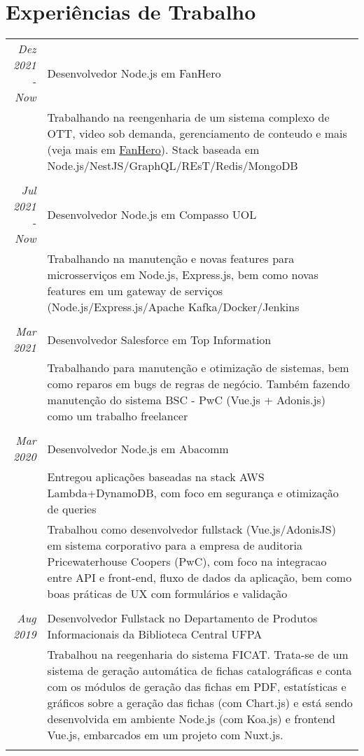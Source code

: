 \documentclass[a4paper,10pt]{article}
\begin{document}
\section{Experiências de Trabalho}
\begin{tabular}{r|p{11cm}}
\emph{Dez 2021 - Now} & Desenvolvedor Node.js em FanHero
 \\ & \footnotesize{Trabalhando na reengenharia de um sistema complexo de OTT, video sob demanda, gerenciamento de conteudo e mais (veja mais em \href{https://fanhero.com}{FanHero}). Stack baseada em Node.js/NestJS/GraphQL/REsT/Redis/MongoDB}\\\\
\emph{Jul 2021 - Now} & Desenvolvedor Node.js em Compasso UOL
 \\ & \footnotesize{Trabalhando na manutenção e novas features para microsserviços em Node.js, Express.js, bem como novas features em um gateway de serviços (Node.js/Express.js/Apache Kafka/Docker/Jenkins}\\\\
\emph{Mar 2021} & Desenvolvedor Salesforce em Top Information
 \\ & \footnotesize{Trabalhando para manutenção e otimização de sistemas, bem como reparos em bugs de regras de negócio. Também fazendo manutenção do sistema BSC - PwC (Vue.js + Adonis.js) como um trabalho freelancer}\\\\
 \emph{Mar 2020} & Desenvolvedor Node.js em Abacomm
 \\ & \footnotesize{Entregou aplicações baseadas na stack AWS Lambda+DynamoDB, com foco em segurança e otimização de queries} \\
 & \footnotesize{Trabalhou como desenvolvedor fullstack (Vue.js/AdonisJS) em sistema corporativo para a empresa de auditoria Pricewaterhouse Coopers (PwC), com foco na integracao entre API e front-end, fluxo de dados da aplicação, bem como boas práticas de UX com formulários e validação} \\\\
 \emph{Aug 2019} & Desenvolvedor Fullstack no Departamento de Produtos Informacionais da Biblioteca Central UFPA\\ & \footnotesize{Trabalhou na reegenharia do sistema FICAT. Trata-se de um sistema de geração automática de fichas catalográficas e conta com os módulos de geração das fichas em PDF, estatísticas e gráficos sobre a geração das fichas (com Chart.js) e está sendo desenvolvida em ambiente Node.js (com Koa.js) e frontend Vue.js, embarcados em um projeto com Nuxt.js.} \\\\

\end{tabular}
\end{document}
